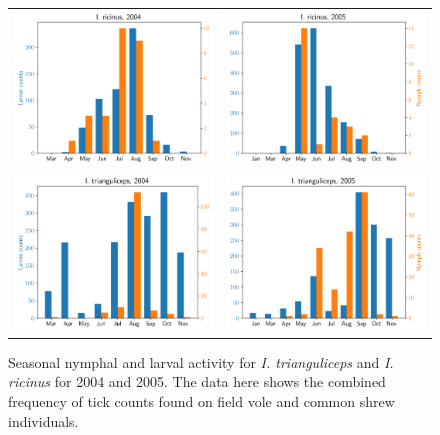 \documentclass{article}
\begin{document}
\begin{figure}[]
	\begin{mdframed}[backgroundcolor=grey250,rightline=false,leftline=false,topline=false]
	\centering
	\begin{tabular}{ll}
		\includegraphics[width=.495\linewidth,valign=m]{I. ricinus, 2004} & \includegraphics[width=.5\linewidth,valign=m]{I. ricinus, 2005} \\
		\includegraphics[width=.495\linewidth,valign=m]{I. trianguliceps, 2004} & \includegraphics[width=.5\linewidth,valign=m]{I. trianguliceps, 2005} \\
	\end{tabular}
	\caption{ Seasonal nymphal and larval activity for \textit{I. trianguliceps} and \textit{I. ricinus} for 2004 and 2005. The data here shows the combined frequency of tick counts found on field vole and common shrew individuals.}
	\label{fig:kielder_seasonal}
	\end{mdframed}
\end{figure}
\end{document}
